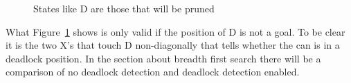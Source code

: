 \documentclass[../../main.tex]{subfiles}
\begin{document}
\begin{figure}[h]
	\centering

	\caption{States like D are those that will be pruned}
	\label{fig:basic_deadlock_detection}
\end{figure}


What Figure~\ref{fig:basic_deadlock_detection} shows is only valid if the position of D is not a goal. To be clear it is the two X's that touch D non-diagonally that tells whether the can is in a deadlock position. In the section about breadth first search there will be a comparison of no deadlock detection and deadlock detection enabled.
\end{document}
